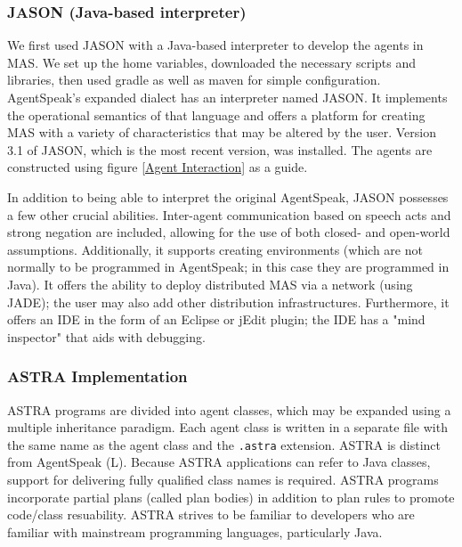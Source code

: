 \subsubsection{JASON (Java-based interpreter)}

We first used JASON with a Java-based interpreter to develop the agents in \ac{MAS}. We set up the home variables, downloaded the necessary scripts and libraries, then used gradle as well as maven for simple configuration. AgentSpeak's expanded dialect has an interpreter named JASON. It implements the operational semantics of that language and offers a platform for creating \ac{MAS} with a variety of characteristics that may be altered by the user. Version 3.1 of JASON, which is the most recent version, was installed. The agents are constructed using figure  \ref{Agent Interaction} as a guide.

\vspace{.5cm}

In addition to being able to interpret the original AgentSpeak, JASON possesses a few other crucial abilities. Inter-agent communication based on speech acts and strong negation are included, allowing for the use of both closed- and open-world assumptions. Additionally, it supports creating environments (which are not normally to be programmed in AgentSpeak; in this case they are programmed in Java). It offers the ability to deploy distributed \ac{MAS} via a network (using \ac{JADE}); the user may also add other distribution infrastructures. Furthermore, it offers an \ac{IDE} in the form of an Eclipse or jEdit plugin; the \ac{IDE} has a "mind inspector" that aids with debugging.

\subsubsection{ASTRA Implementation}

\ac{ASTRA} programs are divided into agent classes, which may be expanded using a multiple inheritance paradigm. Each agent class is written in a separate file with the same name as the agent class and the \texttt{.astra} extension. \ac{ASTRA} is distinct from AgentSpeak (L). Because \ac{ASTRA} applications can refer to Java classes, support for delivering fully qualified class names is required. \ac{ASTRA} programs incorporate partial plans (called plan bodies) in addition to plan rules to promote code/class resuability. \ac{ASTRA} strives to be familiar to developers who are familiar with mainstream programming languages, particularly Java.

